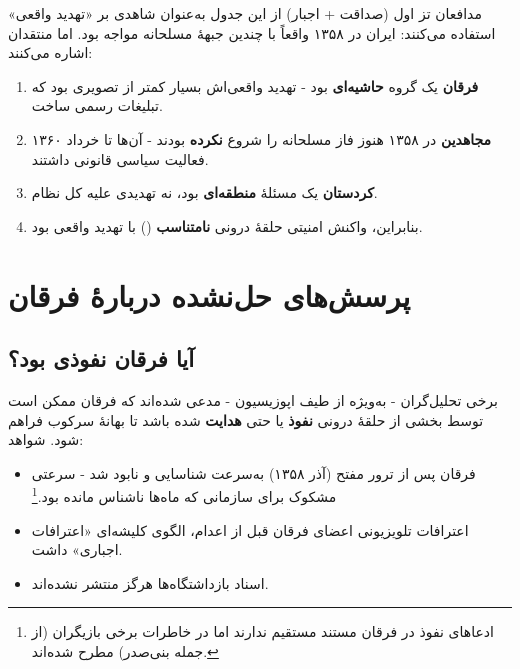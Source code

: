 \documentclass[12pt,a4paper]{book}
\newcommand{\keyword}[1]{\textbf{\textcolor{cPrimary}{#1}}}
\newcommand{\en}[1]{\lr{\textit{#1}}}
\begin{document}
\begin{warningBox}
مدافعان تز اول (صداقت + اجبار) از این جدول به‌عنوان شاهدی بر «تهدید واقعی» استفاده می‌کنند: ایران در ۱۳۵۸ واقعاً با چندین جبههٔ مسلحانه مواجه بود. اما منتقدان اشاره می‌کنند:

\begin{enumerate}[label=\textcolor{cAccent}{\bfseries\arabic*.}, rightmargin=2em]
    \item \textbf{فرقان} یک گروه \keyword{حاشیه‌ای} بود - تهدید واقعی‌اش بسیار کمتر از تصویری بود که تبلیغات رسمی ساخت.
    \item \textbf{مجاهدین} در ۱۳۵۸ هنوز فاز مسلحانه را شروع \keyword{نکرده} بودند - آن‌ها تا خرداد ۱۳۶۰ فعالیت سیاسی قانونی داشتند.
    \item \textbf{کردستان} یک مسئلهٔ \keyword{منطقه‌ای} بود، نه تهدیدی علیه کل نظام.
    \item بنابراین، واکنش امنیتی حلقهٔ درونی \keyword{نامتناسب} (\en{disproportionate}) با تهدید واقعی بود.
\end{enumerate}
\end{warningBox}

\section{پرسش‌های حل‌نشده دربارهٔ فرقان}

\subsection{آیا فرقان نفوذی بود؟}

برخی تحلیل‌گران - به‌ویژه از طیف اپوزیسیون - مدعی شده‌اند که فرقان ممکن است توسط بخشی از حلقهٔ درونی \keyword{نفوذ} یا حتی \keyword{هدایت} شده باشد تا بهانهٔ سرکوب فراهم شود. شواهد:

\begin{itemize}[label=\textcolor{cConsolid}{$\blacktriangleright$}, rightmargin=2em]
    \item فرقان پس از ترور مفتح (آذر ۱۳۵۸) به‌سرعت شناسایی و نابود شد - سرعتی مشکوک برای سازمانی که ماه‌ها ناشناس مانده بود.\footnote{ادعاهای نفوذ در فرقان مستند مستقیم ندارند اما در خاطرات برخی بازیگران (از جمله بنی‌صدر) مطرح شده‌اند.}
    \item اعترافات تلویزیونی اعضای فرقان قبل از اعدام، الگوی کلیشه‌ای «اعترافات اجباری» داشت.
    \item اسناد بازداشتگاه‌ها هرگز منتشر نشده‌اند.
\end{itemize}
\end{document}
